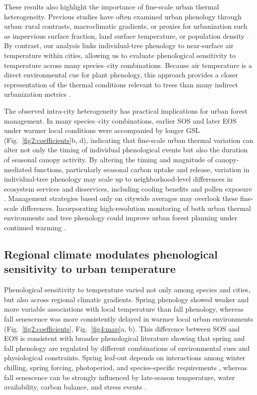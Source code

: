 These results also highlight the importance of fine-scale urban thermal heterogeneity. Previous studies have often examined urban phenology through urban--rural contrasts, macroclimatic gradients, or proxies for urbanization such as impervious surface fraction, land surface temperature, or population density \citep{Dallimer2016EcolEvol, jia_urbanization_2021, Li2017GCB, Meng2020PNAS, Wang2025NatCities, Wang2019NatEcoEvol}. By contrast, our analysis links individual-tree phenology to near-surface air temperature within cities, allowing us to evaluate phenological sensitivity to temperature across many species--city combinations. Because air temperature is a direct environmental cue for plant phenology, this approach provides a closer representation of the thermal conditions relevant to trees than many indirect urbanization metrics \citep{chakraborty_lower_2020, du_simultaneous_2021}. 

The observed intra-city heterogeneity has practical implications for urban forest management. In many species--city combinations, earlier SOS and later EOS under warmer local conditions were accompanied by longer GSL (Fig.~\ref{fig2:coefficients}b, d), indicating that fine-scale urban thermal variation can alter not only the timing of individual phenological events but also the duration of seasonal canopy activity. By altering the timing and magnitude of canopy-mediated functions, particularly seasonal carbon uptake and release, variation in individual-tree phenology may scale up to neighborhood-level differences in ecosystem services and disservices, including cooling benefits and pollen exposure \citep{Crawford2024ERL, Katz2019STOTEN, Song2025SRS}. Management strategies based only on citywide averages may overlook these fine-scale differences. Incorporating high-resolution monitoring of both urban thermal environments and tree phenology could improve urban forest planning under continued warming \citep{Hall2016LandscapeEcol}.

\subsection{Regional climate modulates phenological sensitivity to urban temperature}

Phenological sensitivity to temperature varied not only among species and cities, but also across regional climatic gradients. Spring phenology showed weaker and more variable associations with local temperature than fall phenology, whereas fall senescence was more consistently delayed in warmer local urban environments (Fig.~\ref{fig2:coefficients}, Fig.~\ref{fig4:map}a, b). This difference between SOS and EOS is consistent with broader phenological literature showing that spring and fall phenology are regulated by different combinations of environmental cues and physiological constraints. Spring leaf-out depends on interactions among winter chilling, spring forcing, photoperiod, and species-specific requirements \citep{Ettinger2020NCC, Fu2015Nature, Hanninen2019TPS, Li2022JAG, Meng2020PNAS}, whereas fall senescence can be strongly influenced by late-season temperature, water availability, carbon balance, and stress events \citep{Bigler2021AFM, Chaves1991JXB, Fu2018GCB, Luo2024FunctEcol}.


